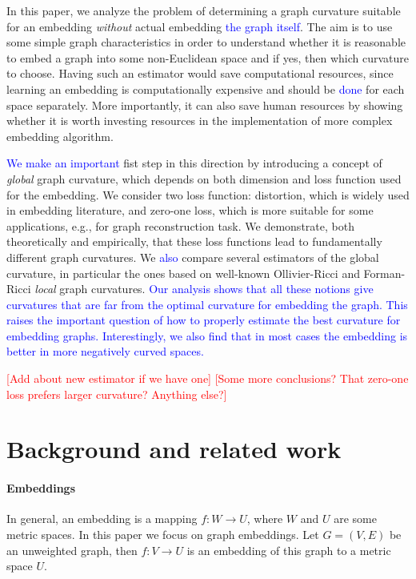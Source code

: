 \documentclass{article} %
\newcommand{\ph}[1]{\textcolor{blue}{#1}}
\begin{document}
In this paper, we analyze the problem of determining a graph curvature suitable for an embedding \textit{without} actual embedding \ph{the graph itself}. The aim is to use some simple graph characteristics in order to understand whether it is reasonable to embed a graph into some non-Euclidean space and if yes, then which curvature to choose. 
Having such an estimator would save computational resources, since learning an embedding is computationally expensive and should be \ph{done} for each space separately. 
More importantly, it can also save human resources by showing whether it is worth investing resources in the implementation of more complex embedding algorithm.

\ph{We make an important} fist step in this direction by introducing a concept of \textit{global} graph curvature, which depends on both dimension and loss function used for the embedding. We consider two loss function: distortion, which is widely used in embedding literature, and zero-one loss, which is more suitable for some applications, e.g., for graph reconstruction task. We demonstrate, both theoretically and empirically, that these loss functions lead to fundamentally different graph curvatures. We \ph{also} compare several estimators of the global curvature, in particular the ones based on well-known Ollivier-Ricci and Forman-Ricci \textit{local} graph curvatures. \ph{Our analysis shows that all these notions give curvatures that are far from the optimal curvature for embedding the graph. This raises the important question of how to properly estimate the best curvature for embedding graphs. Interestingly, we also find that in most cases the embedding is better in more negatively curved spaces.}

\textcolor{red}{[Add about new estimator if we have one]}
\textcolor{red}{[Some more conclusions? That zero-one loss prefers larger curvature? Anything else?]}

\section{Background and related work}\label{sec:related_work}

\paragraph{Embeddings} 
In general, an embedding is a mapping $f: W \rightarrow U$, where $W$ and $U$ are some metric spaces. In this paper we focus on graph embeddings. Let $G = (V,E)$ be an unweighted graph, then $f: V \rightarrow U$ is an embedding of this graph to a metric space $U$. 
\end{document}
